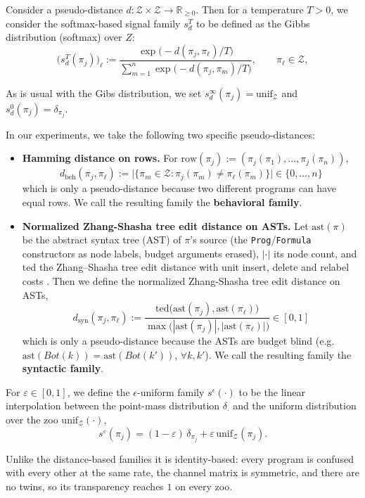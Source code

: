 \documentclass[twoside,11pt]{article}
\begin{document}
\begin{definition}\label{def:App-Softmax-Family}
Consider a pseudo-distance $d : \mathcal{Z} \times \mathcal{Z} \to \mathbb{R}_{\ge 0}$. Then for a temperature $T > 0$, we consider the softmax-based signal family $s_d^T$ to be defined as the Gibbs distribution (softmax) over $Z$:
\[
  \big(s^{T}_{d}(\pi_j)\big)_\ell
  := \frac{\exp\bigl(-d(\pi_j,\pi_\ell)/T\bigr)}
          {\sum_{m=1}^{n} \exp\bigl(-d(\pi_j,\pi_m)/T\bigr)},
  \qquad \pi_\ell \in \mathcal{Z},
\]

As is usual with the Gibs distribution, we set $s^{\infty}_{d}(\pi_j) = \mathrm{unif}_{\mathcal{Z}}$ and $s^{0}_{d}(\pi_j) = \delta_{\pi_j}$.

In our experiments, we take the following two specific pseudo-distances: \begin{itemize}
    \item \textbf{Hamming distance on rows.} For $\mathrm{row}(\pi_j) := (\pi_j(\pi_1),\dots,\pi_j(\pi_n))$,
    \[
    d_{\mathrm{beh}}(\pi_j,\pi_\ell) := \bigl|\{\pi_m \in \mathcal{Z} : \pi_j(\pi_m) \neq \pi_\ell(\pi_m)\}\bigr| \in \{0,\dots,n\}
    \] which is only a pseudo-distance because two different programs can have equal rows. We call the resulting family the \textbf{behavioral family}.
    \item \textbf{Normalized Zhang-Shasha tree edit distance on ASTs.} Let $\mathrm{ast}(\pi)$ be the abstract syntax tree (AST) of $\pi$'s source (the \texttt{Prog}/\texttt{Formula} constructors as node labels, budget arguments erased),
    $|{\cdot}|$ its node count, and $\mathrm{ted}$ the Zhang--Shasha tree edit distance with unit insert, delete and relabel costs \citep{tree_signal_family}. Then we define the normalized Zhang-Shasha tree edit distance on ASTs,
    \[
    d_{\mathrm{syn}}(\pi_j,\pi_\ell) := \frac{\mathrm{ted}\bigl(\mathrm{ast}(\pi_j),\mathrm{ast}(\pi_\ell)\bigr)}
                                           {\max\bigl(|\mathrm{ast}(\pi_j)|,|\mathrm{ast}(\pi_\ell)|\bigr)} \in [0,1]
    \] which is only a pseudo-distance because the ASTs are budget blind (e.g. $\mathrm{ast}(Bot(k)) = \mathrm{ast}(Bot(k'))$, $\forall k, k'$). We call the resulting family the \textbf{syntactic family}.
\end{itemize}
\end{definition}


\begin{definition}\label{def:App-Epsilon}
For $\varepsilon \in [0,1]$, we define the $\epsilon$-uniform family $s^\epsilon(\cdot)$ to be the linear interpolation between the point-mass distribution $\delta_\cdot$ and the uniform distribution over the zoo $\mathrm{unif}_{\mathcal{Z}}(\cdot)$,
\[
  s^{\varepsilon}(\pi_j) = (1-\varepsilon)\,\delta_{\pi_j} + \varepsilon\,\mathrm{unif}_{\mathcal{Z}}(\pi_j).
\]

Unlike the distance-based families it is identity-based: every program is confused with every other at the same rate, the channel matrix is symmetric, and there are no twins, so its
transparency reaches $1$ on every zoo.
\end{definition}
\end{document}
